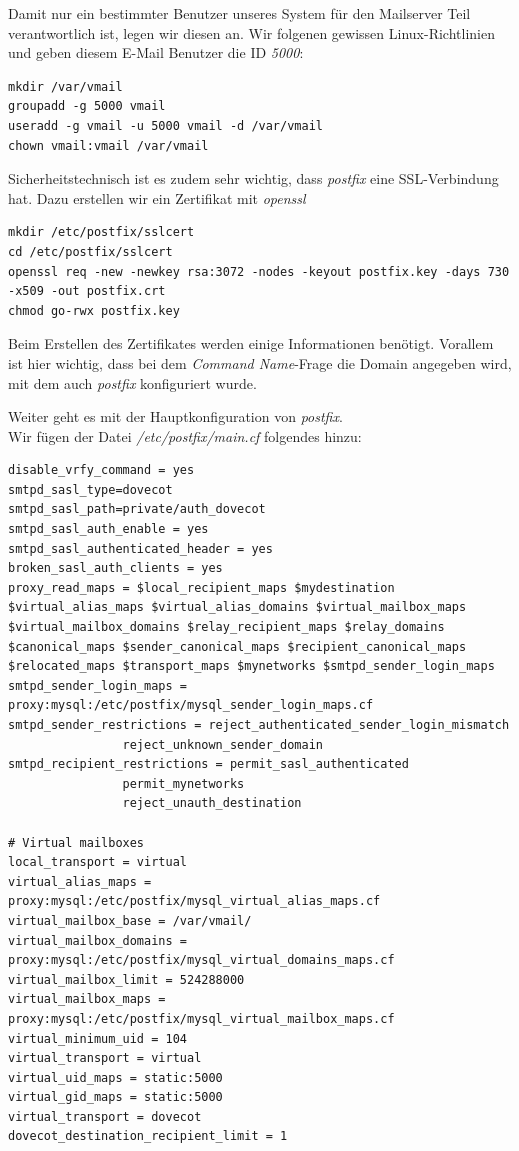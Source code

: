 Damit nur ein bestimmter Benutzer unseres System für den Mailserver Teil verantwortlich ist, legen wir diesen an. Wir folgenen gewissen Linux-Richtlinien und geben diesem E-Mail Benutzer die ID \textit{5000}:

\begin{lstlisting}
mkdir /var/vmail
groupadd -g 5000 vmail
useradd -g vmail -u 5000 vmail -d /var/vmail
chown vmail:vmail /var/vmail
\end{lstlisting}

Sicherheitstechnisch ist es zudem sehr wichtig, dass \textit{postfix} eine SSL-Verbindung hat. Dazu erstellen wir ein Zertifikat mit \textit{openssl}

\begin{lstlisting}
mkdir /etc/postfix/sslcert
cd /etc/postfix/sslcert
openssl req -new -newkey rsa:3072 -nodes -keyout postfix.key -days 730 -x509 -out postfix.crt
chmod go-rwx postfix.key
\end{lstlisting}

Beim Erstellen des Zertifikates werden einige Informationen benötigt. Vorallem ist hier wichtig, dass bei dem \textit{Command Name}-Frage die Domain angegeben wird, mit dem auch \textit{postfix} konfiguriert wurde.

Weiter geht es mit der Hauptkonfiguration von \textit{postfix}. \\
Wir fügen der Datei \textit{/etc/postfix/main.cf} folgendes hinzu:

\begin{lstlisting}
disable_vrfy_command = yes
smtpd_sasl_type=dovecot
smtpd_sasl_path=private/auth_dovecot
smtpd_sasl_auth_enable = yes
smtpd_sasl_authenticated_header = yes
broken_sasl_auth_clients = yes
proxy_read_maps = $local_recipient_maps $mydestination $virtual_alias_maps $virtual_alias_domains $virtual_mailbox_maps $virtual_mailbox_domains $relay_recipient_maps $relay_domains $canonical_maps $sender_canonical_maps $recipient_canonical_maps $relocated_maps $transport_maps $mynetworks $smtpd_sender_login_maps
smtpd_sender_login_maps = proxy:mysql:/etc/postfix/mysql_sender_login_maps.cf
smtpd_sender_restrictions = reject_authenticated_sender_login_mismatch
                reject_unknown_sender_domain
smtpd_recipient_restrictions = permit_sasl_authenticated
                permit_mynetworks
                reject_unauth_destination

# Virtual mailboxes
local_transport = virtual
virtual_alias_maps = proxy:mysql:/etc/postfix/mysql_virtual_alias_maps.cf
virtual_mailbox_base = /var/vmail/
virtual_mailbox_domains = proxy:mysql:/etc/postfix/mysql_virtual_domains_maps.cf
virtual_mailbox_limit = 524288000
virtual_mailbox_maps = proxy:mysql:/etc/postfix/mysql_virtual_mailbox_maps.cf
virtual_minimum_uid = 104
virtual_transport = virtual
virtual_uid_maps = static:5000
virtual_gid_maps = static:5000
virtual_transport = dovecot
dovecot_destination_recipient_limit = 1
\end{lstlisting}

